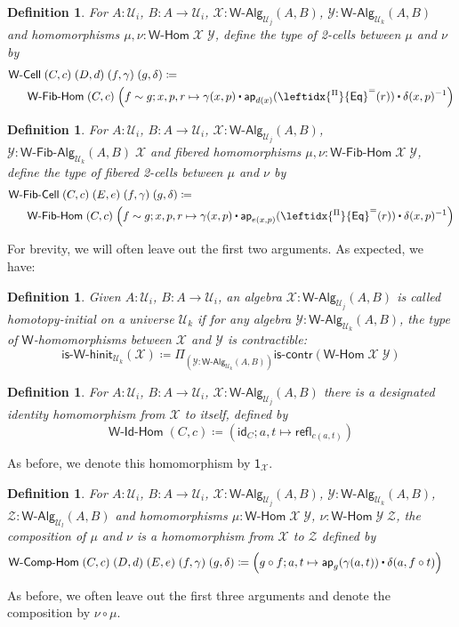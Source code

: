 \documentclass[reqno,10pt,a4paper,oneside]{amsart}
\newcommand{\X}{\mathcal{X}}
\newcommand{\Y}{\mathcal{Y}}
\newcommand{\Z}{\mathcal{Z}}
\newcommand{\comp}{\circ}
\newcommand{\idfun}[1]{\mathsf{id}_{#1}}
\newcommand{\prd}[1]{\Pi_{#1}}
\newcommand{\defeq}{\coloneqq}
\newcommand{\refl}{\mathsf{refl}}
\newcommand{\W}{\mathsf{W}}
\newcommand{\funext}{\leftidx{^\Pi}{\mathsf{Eq}}^{=}}
\newcommand{\one}{\mathsf{1}}
\newcommand{\UU}{\mathcal{U}}
\newcommand{\WCell}{\mathsf{W}\text{-}\mathsf{Cell}}
\newcommand{\WFibCell}{\mathsf{W}\text{-}\mathsf{Fib}\text{-}\mathsf{Cell}}
\newcommand{\WAlg}{\mathsf{W}\text{-}\mathsf{Alg}}
\newcommand{\WFibAlg}{\mathsf{W}\text{-}\mathsf{Fib}\text{-}\mathsf{Alg}}
\newcommand{\WHom}{\mathsf{W}\text{-}\mathsf{Hom}}
\newcommand{\WFibHom}{\mathsf{W}\text{-}\mathsf{Fib}\text{-}\mathsf{Hom}}
\newcommand{\IsWHInit}{\mathsf{is}\text{-}\mathsf{\W}\text{-}\mathsf{hinit}}
\newcommand{\app}{\mathsf{ap}}
\newcommand{\iscontr}{\mathsf{is}\text{-}\mathsf{contr}}
\newcommand{\WIdHom}{\mathsf{W}\text{-}\mathsf{Id}\text{-}\mathsf{Hom}}
\newcommand{\WCompHom}{\mathsf{W}\text{-}\mathsf{Comp}\text{-}\mathsf{Hom}}
\newcommand{\ct}{%
  \mathchoice{\mathbin{\raisebox{0.5ex}{$\displaystyle\centerdot$}}}%
             {\mathbin{\raisebox{0.5ex}{$\centerdot$}}}%
             {\mathbin{\raisebox{0.25ex}{$\scriptstyle\,\centerdot\,$}}}%
             {\mathbin{\raisebox{0.1ex}{$\scriptscriptstyle\,\centerdot\,$}}}}
\numberwithin{equation}{section}
\theoremstyle{mythm}
\theoremstyle{mydef}
\newtheorem{definition}[theorem]{Definition}
\theoremstyle{myrmk}
\begin{document}
\begin{definition}\label{def:WCell}
For $A:\UU_i$, $B : A \to \UU_i$, $\X : \WAlg_{\UU_j}(A,B)$, $\Y : \WAlg_{\UU_k}(A,B)$ and homomorphisms $\mu, \nu : \WHom \; \X \; \Y$, define the type of \emph{2-cells} between $\mu$ and $\nu$ by
\begin{align*} & \WCell \; (C,c) \; (D,d) \; (f,\gamma) \; (g,\delta) \defeq \\ & \;\;\; \;\;\;\WFibHom \; (C,c) \; \Big(f \sim g; x,p,r \mapsto \gamma(x,p) \ct \app_{d(x)}(\funext(r)) \ct \delta(x,p)^{-1}\Big)
\end{align*}
\end{definition}

\begin{definition}\label{def:WFibCell}
For $A:\UU_i$, $B : A \to \UU_i$, $\X : \WAlg_{\UU_j}(A,B)$, $\Y : \WFibAlg_{\UU_k}(A,B) \; \X$ and fibered homomorphisms $\mu, \nu : \WFibHom \; \X \; \Y$, define the type of \emph{fibered 2-cells} between $\mu$ and $\nu$ by
\begin{align*} & \WFibCell \; (C,c) \; (E, e) \; (f,\gamma) \; (g,\delta) \defeq \\ & \;\;\; \;\;\;\WFibHom \; (C,c) \; \Big(f \sim g; x,p,r \mapsto \gamma(x,p) \ct \app_{e(x,p)}(\funext(r)) \ct \delta(x,p)^{-1}\Big)
\end{align*}
\end{definition}
For brevity, we will often leave out the first two arguments. As expected, we have:
\begin{definition}\label{def:WHInit}
Given $A:\UU_i$, $B : A \to \UU_i$, an algebra $\X : \WAlg_{\UU_j}(A,B)$ is called \emph{homotopy-initial} on a universe $\UU_k$ if for any algebra $\Y : \WAlg_{\UU_k}(A,B)$, the type of $\W$-homomorphisms between $\X$ and $\Y$ is contractible:
\[ \IsWHInit_{\UU_k}(\X) \defeq \prd{(\Y:\WAlg_{\UU_k}(A,B))} \iscontr(\WHom \; \X \; \Y) \]  
\end{definition}

\begin{definition}
For $A:\UU_i$, $B : A \to \UU_i$, $\X : \WAlg_{\UU_j}(A,B)$ there is a designated \emph{identity} homomorphism from $\X$ to itself, defined by
\[ \WIdHom \; (C,c) \defeq (\idfun{C}; a,t \mapsto \refl_{c(a,t)}) \]
\end{definition}
As before, we denote this homomorphism by $\one_\X$.

\begin{definition}
For $A:\UU_i$, $B : A \to \UU_i$, $\X : \WAlg_{\UU_j}(A,B)$, $\Y : \WAlg_{\UU_k}(A,B)$, $\Z : \WAlg_{\UU_l}(A,B)$ and homomorphisms $\mu : \WHom \; \X \; \Y$, $\nu : \WHom \; \Y \; \Z$, the \emph{composition} of $\mu$ and $\nu$ is a homomorphism from $\X$ to $\Z$ defined by
\begin{align*} & \WCompHom \; (C,c) \; (D,d) \; (E,e) \; (f,\gamma) \; (g,\delta) \defeq  \Big(g \comp f; a,t \mapsto \app_g(\gamma(a,t)) \ct \delta(a, f \comp t) \Big)
\end{align*}
\end{definition}
As before, we often leave out the first three arguments and denote the composition by $\nu \comp \mu$.
\end{document}
